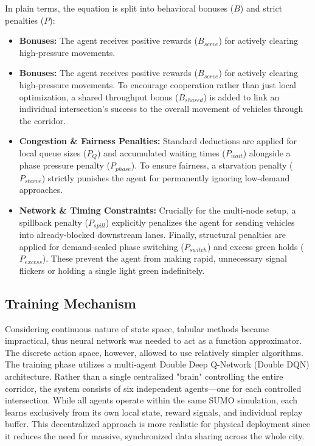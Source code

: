 \documentclass[conference]{IEEEtran}
\begin{document}
In plain terms, the equation is split into behavioral bonuses ($B$) and strict penalties ($P$):
\begin{itemize}
    \item \textbf{Bonuses:} The agent receives positive rewards ($B_{serve}$) for actively clearing high-pressure movements.
\end{itemize}

\begin{itemize}
    \item \textbf{Bonuses:} The agent receives positive rewards ($B_{serve}$) for actively clearing high-pressure movements. To encourage cooperation rather than just local optimization, a shared throughput bonus ($B_{shared}$) is added to link an individual intersection's success to the overall movement of vehicles through the corridor.
    \item \textbf{Congestion \& Fairness Penalties:} Standard deductions are applied for local queue sizes ($P_Q$) and accumulated waiting times ($P_{wait}$) alongside a phase pressure penalty ($P_{phase}$). To ensure fairness, a starvation penalty ($P_{starve}$) strictly punishes the agent for permanently ignoring low-demand approaches.
    \item \textbf{Network \& Timing Constraints:} Crucially for the multi-node setup, a spillback penalty ($P_{spill}$) explicitly penalizes the agent for sending vehicles into already-blocked downstream lanes. Finally, structural penalties are applied for demand-scaled phase switching ($P_{switch}$) and excess green holds ($P_{excess}$). These prevent the agent from making rapid, unnecessary signal flickers or holding a single light green indefinitely.
\end{itemize}

\subsection{Training Mechanism}

Considering continuous nature of state space, tabular methods became impractical, thus neural network was needed to act as a function approximator. The discrete action space, however, allowed to use relatively simpler algorithms. The training phase utilizes a multi-agent Double Deep Q-Network (Double DQN) architecture. Rather than a single centralized "brain" controlling the entire corridor, the system consists of six independent agents—one for each controlled intersection. While all agents operate within the same SUMO simulation, each learns exclusively from its own local state, reward signals, and individual replay buffer. This decentralized approach is more realistic for physical deployment since it reduces the need for massive, synchronized data sharing across the whole city.
\end{document}
